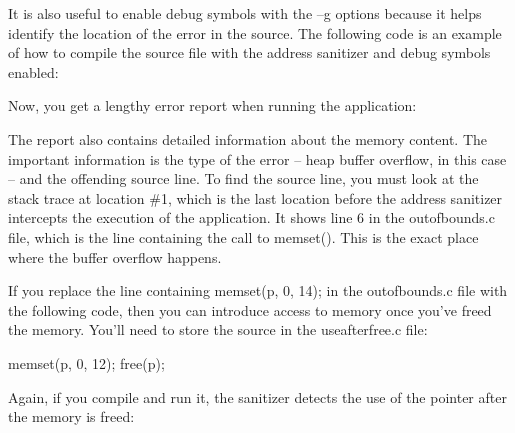 It is also useful to enable debug symbols with the –g options because it helps identify the location of the error in the source. The following code is an example of how to compile the source file with the address sanitizer and debug symbols enabled:


Now, you get a lengthy error report when running the application:


The report also contains detailed information about the memory content. The important information is the type of the error – heap buffer overflow, in this case – and the offending source line. To find the source line, you must look at the stack trace at location \#1, which is the last location before the address sanitizer intercepts the execution of the application. It shows line 6 in the outofbounds.c file, which is the line containing the call to memset(). This is the exact place where the buffer overflow happens.

If you replace the line containing memset(p, 0, 14); in the outofbounds.c file with the following code, then you can introduce access to memory once you’ve freed the memory. You’ll need to store the source in the useafterfree.c file:

\begin{cpp}
memset(p, 0, 12);
free(p);
\end{cpp}

Again, if you compile and run it, the sanitizer detects the use of the pointer after the memory is freed:


